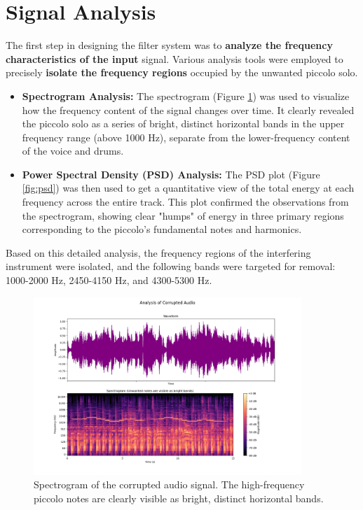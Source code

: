 \documentclass[11pt, a4paper]{article}
\begin{document}
\section{Signal Analysis}
The first step in designing the filter system was to \textbf{analyze the frequency characteristics of the input} signal. Various analysis tools were employed to precisely \textbf{isolate the frequency regions} occupied by the unwanted piccolo solo.

\begin{itemize}
    \item \textbf{Spectrogram Analysis:} The spectrogram (Figure \ref{fig:spec_orig}) was used to visualize how the frequency content of the signal changes over time. It clearly revealed the piccolo solo as a series of bright, distinct horizontal bands in the upper frequency range (above 1000 Hz), separate from the lower-frequency content of the voice and drums.
    
    \item \textbf{Power Spectral Density (PSD) Analysis:} The PSD plot (Figure \ref{fig:psd}) was then used to get a quantitative view of the total energy at each frequency across the entire track. This plot confirmed the observations from the spectrogram, showing clear "humps" of energy in three primary regions corresponding to the piccolo's fundamental notes and harmonics.
\end{itemize}

Based on this detailed analysis, the frequency regions of the interfering instrument were isolated, and the following bands were targeted for removal: 1000-2000 Hz, 2450-4150 Hz, and 4300-5300 Hz.

\begin{figure}[H]
    \centering
    \includegraphics[width=0.9\textwidth]{q2_part1a_corrupted_analysis.png}
    \caption{Spectrogram of the corrupted audio signal. The high-frequency piccolo notes are clearly visible as bright, distinct horizontal bands.}
    \label{fig:spec_orig}
\end{figure}
\end{document}
